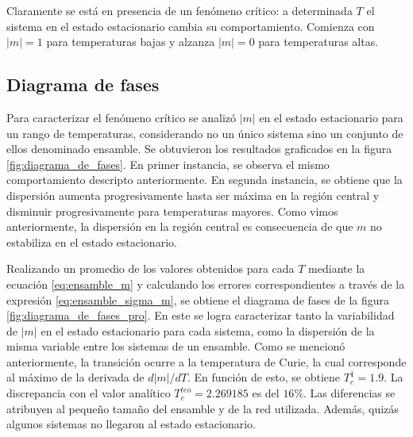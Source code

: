 \documentclass[aps,prb,twocolumn,superscriptaddress,floatfix,longbibliography]{revtex4-2}
\newcounter{para}
\begin{document}
Claramente se está en presencia de un fenómeno crítico: a determinada $T$ el sistema en el estado estacionario cambia su comportamiento. Comienza con $|m| = 1$ para temperaturas bajas y alzanza $|m| = 0$ para temperaturas altas.

\subsection{Diagrama de fases}
Para caracterizar el fenómeno crítico se analizó $|m|$ en el estado estacionario para un rango de temperaturas, considerando no un único sistema sino un conjunto de ellos denominado ensamble. Se obtuvieron los resultados graficados en la figura \ref{fig:diagrama_de_fases}. En primer instancia, se observa el mismo comportamiento descripto anteriormente. En segunda instancia, se obtiene que la dispersión aumenta progresivamente hasta ser máxima en la región central y disminuir progresivamente para temperaturas mayores. Como vimos anteriormente, la dispersión en la región central es consecuencia de que $m$ no estabiliza en el estado estacionario.

Realizando un promedio de los valores obtenidos para cada $T$ mediante la ecuación \ref{eq:ensamble_m} y calculando los errores correspondientes a través de la expresión \ref{eq:ensamble_sigma_m}, se obtiene el diagrama de fases de la figura \ref{fig:diagrama_de_fases_pro}. En este se logra caracterizar tanto la variabilidad de $|m|$ en el estado estacionario para cada sistema, como la dispersión de la misma variable entre los sistemas de un ensamble. Como se mencionó anteriormente, la transición ocurre a la temperatura de Curie, la cual corresponde al máximo de la derivada de $ d|m|/dT$. En función de esto, se obtiene $T_c^1 = 1.9$. La discrepancia con el valor analítico $T_c^{teo} = 2.269185$ es del $ 16 \% $. Las diferencias se atribuyen al pequeño tamaño del ensamble y de la red utilizada. Además, quizás algunos sistemas no llegaron al estado estacionario.
\end{document}
